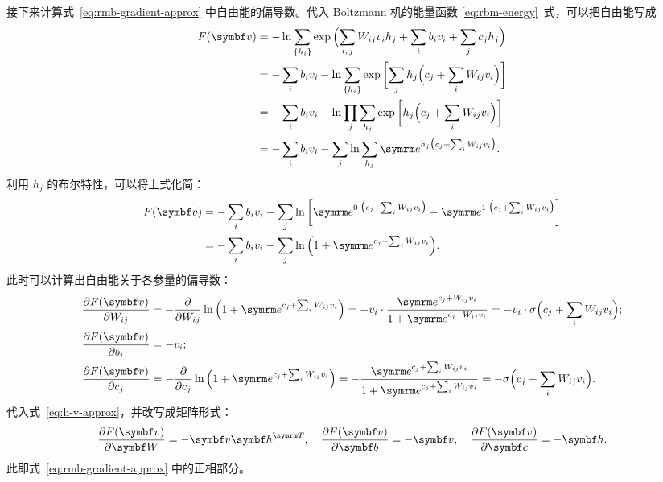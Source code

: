 接下来计算式~\eqref{eq:rmb-gradient-approx} 中自由能的偏导数。代入 Boltzmann 机的能量函数
\eqref{eq:rbm-energy}~式，可以把自由能写成
\begin{align}
  F(\bm{v})
  &= - \ln \sum_{\q{h_i}}
       \exp\qty\Big(\sum_{i,\,j} W_{ij} v_i h_j + \sum_i b_i v_i + \sum_j c_j h_j) \notag \\
  &= - \sum_i b_i v_i
     - \ln \sum_{\q{h_i}} \exp\qty\bigg[\sum_j h_j \qty\Big(c_j + \sum_i W_{ij} v_i)] \notag \\
  &= - \sum_i b_i v_i
     - \ln \prod_j \sum_{h_j} \exp\qty\bigg[h_j \qty\Big(c_j + \sum_i W_{ij} v_i)] \notag \\
  &= - \sum_i b_i v_i
     - \sum_j \ln \sum_{h_j} \ee^{h_j \qty\big(c_j + \sum_i W_{ij} v_i)}.
\end{align}
利用 $h_j$ 的布尔特性，可以将上式化简：
\begin{align}
  F(\bm{v})
  &= - \sum_i b_i v_i - \sum_j \ln
       \qty\bigg[  \ee^{0 \cdot \qty\big(c_j + \sum_i W_{ij} v_i)}
                 + \ee^{1 \cdot \qty\big(c_j + \sum_i W_{ij} v_i)}] \notag \\
  &= - \sum_i b_i v_i - \sum_j \ln \qty\Big(1 + \ee^{c_j + \sum_i W_{ij} v_i}).
\end{align}
此时可以计算出自由能关于各参量的偏导数：
\begin{align}
  \pdv{F(\bm{v})}{W_{ij}} &= - \pdv{W_{ij}} \ln \qty\Big(1+\ee^{c_j+\sum_iW_{ij}v_i})
                           = - v_i \cdot \frac{\ee^{c_j+W_{ij}v_i}}{1+\ee^{c_j+W_{ij}v_i}}
                           = - v_i \cdot \sigma\qty\Big(c_j+\sum_iW_{ij}v_i); \\
  \pdv{F(\bm{v})}{b_i}    &= - v_i; \\
  \pdv{F(\bm{v})}{c_j}    &= - \pdv{c_j} \ln \qty\Big(1+\ee^{c_j+\sum_iW_{ij}v_i})
                           = - \frac{\ee^{c_j+\sum_iW_{ij}v_i}}{1+\ee^{c_j+\sum_iW_{ij}v_i}}
                           = - \sigma\qty\Big(c_j+\sum_iW_{ij}v_i).
\end{align}
代入式~\eqref{eq:h-v-approx}，并改写成矩阵形式：
\begin{equation}
  \pdv{F(\bm{v})}{\bm{W}} = - \bm{v} \bm{h}^\trans \qc
  \pdv{F(\bm{v})}{\bm{b}} = - \bm{v} \qc
  \pdv{F(\bm{v})}{\bm{c}} = - \bm{h}.
\end{equation}
此即式~\eqref{eq:rmb-gradient-approx} 中的正相部分。

